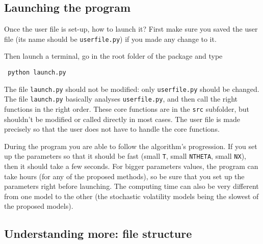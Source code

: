 \documentclass[a4paper,10pt]{paper}
\begin{document}
\subsection{Launching the program}

Once the user file is set-up, how to launch it? First make sure you saved the user file (its name should be \texttt{userfile.py}) if you made any change to it.

Then launch a terminal, go in the root folder of the package and type
\begin{center}
 \begin{lstlisting}
 python launch.py
\end{lstlisting}
\end{center}

The file \texttt{launch.py} should not be modified: only \texttt{userfile.py} should be changed. The file \texttt{launch.py} basically analyses \texttt{userfile.py}, and then call the right functions in the right order. These core functions are in the \texttt{src} subfolder, but shouldn't be modified or called directly in most cases. The user file is made precisely so that the user does not have to handle the core functions.

During the program you are able to follow the algorithm's progression. If you set up the parameters so that it should be fast (small \texttt{T}, small \texttt{NTHETA}, small \texttt{NX}), then it should take a few seconds. For bigger parameters values, the program can take hours (for any of the proposed methods), so be sure that you set up
the parameters right before launching. The computing time can also be very different from one model to the other (the stochastic volatility models being the slowest of the proposed models).

\subsection{Understanding more: file structure}
\end{document}
